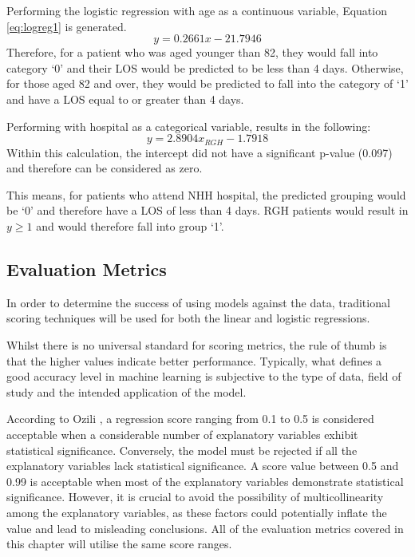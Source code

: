 \documentclass[../thesis.tex]{subfiles}
\begin{document}
Performing the logistic regression with age as a continuous variable, Equation \eqref{eq:logreg1} is generated.
\begin{equation}\label{eq:logreg1}
y = 0.2661x-21.7946
\end{equation}
Therefore, for a patient who was aged younger than 82, they would fall into category `0' and their LOS would be predicted to be less than 4 days. Otherwise, for those aged 82 and over, they would be predicted to fall into the category of `1' and have a LOS equal to or greater than 4 days.

Performing with hospital as a categorical variable, results in the following:
\begin{equation}\label{eq:logreg2}
y = 2.8904x_{RGH} -1.7918 
\end{equation}
Within this calculation, the intercept did not have a significant p-value (0.097) and therefore can be considered as zero.

This means, for patients who attend NHH hospital, the predicted grouping would be `0' and therefore have a LOS of less than 4 days. RGH patients would result in $y \geq 1$ and would therefore fall into group `1'.


\subsection{Evaluation Metrics}
In order to determine the success of using models against the data, traditional scoring techniques will be used for both the linear and logistic regressions.


Whilst there is no universal standard for scoring metrics, the rule of thumb is that the higher values indicate better performance. Typically, what defines a good accuracy level in machine learning is subjective to the type of data, field of study and the intended application of the model.

According to Ozili \cite{Ozili2023}, a regression score ranging from 0.1 to 0.5 is considered acceptable when a considerable number of explanatory variables exhibit statistical significance. Conversely, the model must be rejected if all the explanatory variables lack statistical significance. A score value between 0.5 and 0.99 is acceptable when most of the explanatory variables demonstrate statistical significance. However, it is crucial to avoid the possibility of multicollinearity among the explanatory variables, as these factors could potentially inflate the value and lead to misleading conclusions. All of the evaluation metrics covered in this chapter will utilise the same score ranges.
\end{document}
